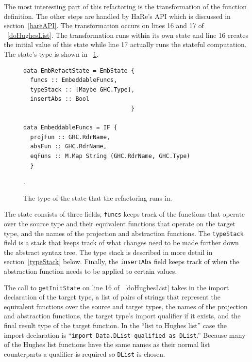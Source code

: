 The most interesting part of this refactoring is the transformation of the function definition. The other steps are handled by HaRe's API which is discussed in section~\ref{hareAPI}. The transformation occurs on lines 16 and 17 of \DIFdelbegin {}\DIFdelend \DIFaddbegin {}\DIFaddend ~\ref{doHughesList}. The transformation runs within its own state and line 16 creates the initial value of this state while line 17 actually runs the stateful computation. The state's type is shown in \DIFdelbegin {}\DIFdelend \DIFaddbegin {}\DIFaddend ~\ref{embState}.

\begin{figure}[t]
\begin{lstlisting}
data EmbRefactState = EmbState {
  funcs :: EmbeddableFuncs,
  typeStack :: [Maybe GHC.Type],
  insertAbs :: Bool
                               }

data EmbeddableFuncs = IF {
  projFun :: GHC.RdrName,
  absFun :: GHC.RdrName,
  eqFuns :: M.Map String (GHC.RdrName, GHC.Type)
  }
\end{lstlisting}
\caption{The type of the state that the refactoring runs in.}
\label{embState}.
\end{figure}

The state consists of three fields, \texttt{funcs} keeps track of the functions that operate over the source type and their equivalent functions that operate on the target type, and the names of the projection and abstraction functions. The \texttt{typeStack} field is a stack that keeps track of what changes need to be made further down the abstract syntax tree. The type stack is described in more detail in section~\ref{typeStack} below. Finally, the \texttt{insertAbs} field keeps track of when the abstraction function needs to be applied to certain values.

The call to \texttt{getInitState} on line 16 of \DIFdelbegin {}\DIFdelend \DIFaddbegin {}\DIFaddend ~\ref{doHughesList} takes in the import declaration of the target type, a list of pairs of strings that represent the equivalent functions over the source and target types, the names of the projection and abstraction functions, the target type's import qualifier if it exists, and the final result type of the target function. In the ``list to Hughes list'' case the import declaration is ``\texttt{import Data.DList qualified as DList}.'' Because many of the Hughes list functions have the same names as their normal list counterparts a qualifier is required so \texttt{DList} is chosen. 

